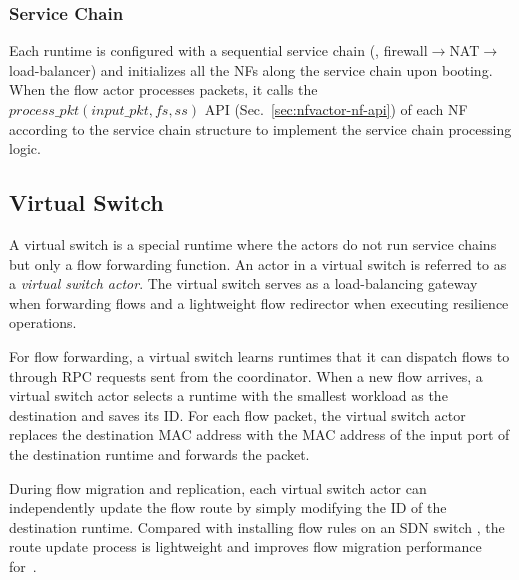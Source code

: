 \subsubsection{Service Chain}
\label{sec:rtsc}

Each runtime is configured with a sequential service chain (\eg, firewall$\rightarrow$NAT$\rightarrow$load-balancer) and initializes all the NFs along the service chain upon booting. When the flow actor processes packets, it calls the $process\_pkt(input\_pkt, fs, ss)$ API (Sec.~\ref{sec:nfvactor-nf-api}) of each NF according to the service chain structure to implement the service chain processing logic.


\subsection{Virtual Switch}
\label{sec:virtualswitch}

A virtual switch is a special runtime where the actors do not run service chains but only a flow forwarding function. An actor in a virtual switch is referred to as a {\em virtual switch actor}. The virtual switch serves as a load-balancing gateway when forwarding flows and a lightweight flow redirector when executing resilience operations.

For flow forwarding, a virtual switch learns runtimes that it can dispatch flows to through RPC requests sent from the coordinator. When a new flow arrives, a virtual switch actor selects a runtime with the smallest workload as the destination and saves its ID. For each flow packet, the virtual switch actor replaces the destination MAC address with the MAC address of the input port of the destination runtime and forwards the packet. %

During flow migration and replication, each virtual switch actor can independently update the flow route by simply modifying the ID of the destination runtime. Compared with installing flow rules on an SDN switch \cite{rajagopalan2013split, gember2015opennf}, the route update process is lightweight and improves flow migration performance for~\nfactor.

